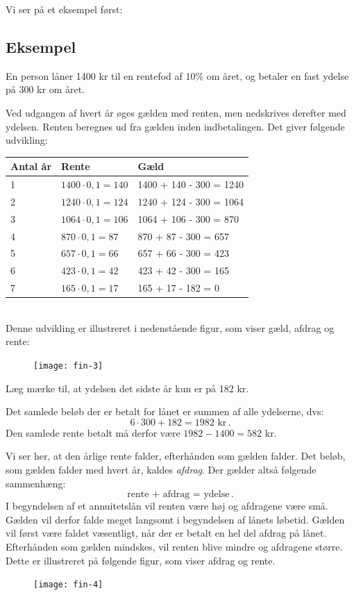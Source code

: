 \documentclass[12pt,oneside,a4paper]{article}
\begin{document}
Vi ser på et eksempel først:
\begin{tcolorbox}
\subsection*{Eksempel}
En person låner 1400 kr til en rentefod af $10\%$ om året, og betaler en fast
ydelse på 300 kr om året.

Ved udgangen af hvert år øges gælden med renten, men nedskrives derefter med
ydelsen. Renten beregnes ud fra gælden inden indbetalingen.  Det giver
følgende udvikling:
\\

\begin{tabular}{|l|l|l|}
    \hline
    \textbf{Antal år} & \textbf{Rente} & \textbf{Gæld} \\
    \hline
    1 & $1400\cdot 0,1 = 140$ & 1400 + 140 - 300 = 1240 \\
    \hline
    2 & $1240\cdot 0,1 = 124$ & 1240 + 124 - 300 = 1064 \\
    \hline
    3 & $1064\cdot 0,1 = 106$ & 1064 + 106 - 300 =  870 \\
    \hline
    4 & $870\cdot 0,1 = 87$ & 870 + 87 - 300 = 657 \\
    \hline
    5 & $657\cdot 0,1 = 66$ & 657 + 66 - 300 = 423 \\
    \hline
    6 & $423\cdot 0,1 = 42$ & 423 + 42 - 300 = 165 \\
    \hline
    7 & $165\cdot 0,1 = 17$ & 165 + 17 - 182 = 0 \\
    \hline
\end{tabular}
\\

Denne udvikling er illustreret i nedenstående figur, som viser gæld, afdrag og rente:
\begin{figure}[H]
    \centering
    \texttt{[image: fin-3]}
\end{figure}

Læg mærke til, at ydelsen det sidste år kun er på 182 kr.

Det samlede beløb der er betalt for lånet er summen af alle ydelserne, dvs:
\[
6\cdot 300 + 182 = 1982 \,\,\mbox{kr}\,.
\]
Den samlede rente betalt må derfor være $1982 - 1400 = 582$ kr.

\end{tcolorbox}

Vi ser her, at den årlige rente falder, efterhånden som gælden falder. Det
beløb, som gælden falder med hvert år, kaldes \emph{afdrag}. Der gælder
altså følgende sammenhæng:
\[
\mbox{rente + afdrag = ydelse}\,.
\]
I begyndelsen af et annuitetslån vil renten være høj og afdragene være små.
Gælden vil derfor falde meget langsomt i begyndelsen af lånets løbetid.  Gælden
vil først være faldet væsentligt, når der er betalt en hel del afdrag på lånet.
Efterhånden som gælden mindskes, vil renten blive mindre og afdragene
større. Dette er illustreret på følgende figur, som viser afdrag og rente.
\begin{figure}[H]
    \centering
    \texttt{[image: fin-4]}
\end{figure}
\end{document}
